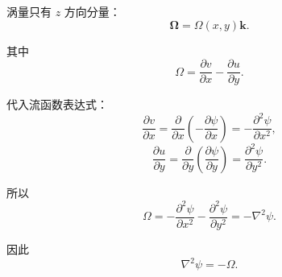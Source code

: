﻿\documentclass[12pt,a4paper]{ctexart}
\begin{document}
涡量只有 \(z\) 方向分量：
\[
\bm\Omega=\Omega(x,y)\bm k.
\]

其中
\[
\Omega=\frac{\partial v}{\partial x}
-\frac{\partial u}{\partial y}.
\]

代入流函数表达式：
\[
\frac{\partial v}{\partial x}
=\frac{\partial}{\partial x}
\left(-\frac{\partial\psi}{\partial x}\right)
=-\frac{\partial^2\psi}{\partial x^2},
\]
\[
\frac{\partial u}{\partial y}
=\frac{\partial}{\partial y}
\left(\frac{\partial\psi}{\partial y}\right)
=\frac{\partial^2\psi}{\partial y^2}.
\]

所以
\[
\Omega
=-\frac{\partial^2\psi}{\partial x^2}
-\frac{\partial^2\psi}{\partial y^2}
=-\nabla^2\psi.
\]

因此
\[
\boxed{
\nabla^2\psi=-\Omega.
}
\]
\end{document}
